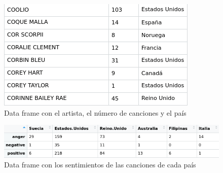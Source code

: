 \begin{figure}[h]
	\centering
	\includegraphics[width=0.7\linewidth]{Imagenes/artistcountry}
	\caption{Data frame con el artista, el número de canciones y el país}
	\label{fig:artistcountry}
\end{figure}

\begin{figure}[h]
	\centering
	\includegraphics[width=0.7\linewidth]{Imagenes/sentimenttablebycountry}
	\caption{Data frame con los sentimientos de las canciones de cada país}
	\label{fig:sentimenttablebycountry}
\end{figure}
